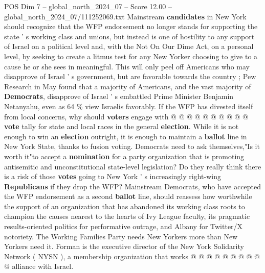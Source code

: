 \begin{textsample}{POS Dim 7 – global\_north\_2024\_07 – Score 12.00 – global\_north\_2024\_07/111252069.txt}
Mainstream \textbf{candidates} in New York should recognize that the WFP endorsement no longer stands for supporting the state ' s working class and unions, but instead is one of hostility to any support of Israel on a political level and, with the Not On Our Dime Act, on a personal level, by seeking to create a litmus test for any New Yorker choosing to give to a cause he or she sees in meaningful.
This will only peel off Americans who may disapprove of Israel ' s government, but are favorable towards the country ; Pew Research in May found that a majority of Americans, and the vast majority of \textbf{Democrats}, disapprove of Israel ' s embattled Prime Minister Benjamin Netanyahu, even as 64 \% view Israelis favorably.
If the WFP has divested itself from local concerns, why should \textbf{voters} engage with @ @ @ @ @ @ @ @ @ @ \textbf{vote} tally for state and local races in the general \textbf{election}.
While it is not enough to win an \textbf{election} outright, it is enough to maintain a \textbf{ballot} line in New York State, thanks to fusion voting.
Democrats need to ask themselves,"Is it worth it"to accept a \textbf{nomination} for a party organization that is promoting antisemitic and unconstitutional state-level legislation?
Do they really think there is a risk of those \textbf{votes} going to New York ' s increasingly right-wing \textbf{Republicans} if they drop the WFP?
Mainstream Democrats, who have accepted the WFP endorsement as a second \textbf{ballot} line, should reassess how worthwhile the support of an organization that has abandoned its working class roots to champion the causes nearest to the hearts of Ivy League faculty, its pragmatic results-oriented politics for performative outrage, and Albany for Twitter/X notoriety.
The Working Families Party needs New Yorkers more than New Yorkers need it.
Forman is the executive director of the New York Solidarity Network ( NYSN ), a membership organization that works @ @ @ @ @ @ @ @ @ @ alliance with Israel.

\end{textsample}
